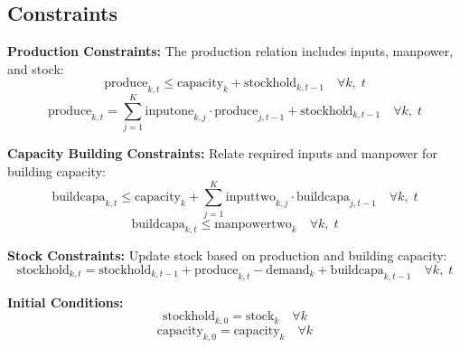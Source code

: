 \documentclass{article}
\begin{document}
\subsection*{Constraints}
\textbf{Production Constraints:} The production relation includes inputs, manpower, and stock:
\[
\text{produce}_{k, t} \leq \text{capacity}_{k} + \text{stockhold}_{k, t-1} \quad \forall k, \; t
\]
\[
\text{produce}_{k, t} = \sum_{j=1}^{K} \text{inputone}_{k, j} \cdot \text{produce}_{j, t-1} + \text{stockhold}_{k, t-1} \quad \forall k, \; t
\]

\textbf{Capacity Building Constraints:} Relate required inputs and manpower for building capacity:
\[
\text{buildcapa}_{k, t} \leq \text{capacity}_{k} + \sum_{j=1}^{K} \text{inputtwo}_{k, j} \cdot \text{buildcapa}_{j, t-1} \quad \forall k, \; t
\]
\[
\text{buildcapa}_{k, t} \leq \text{manpowertwo}_{k} \quad \forall k, \; t
\]

\textbf{Stock Constraints:} Update stock based on production and building capacity:
\[
\text{stockhold}_{k, t} = \text{stockhold}_{k, t-1} + \text{produce}_{k, t} - \text{demand}_{k} + \text{buildcapa}_{k, t-1} \quad \forall k, \; t
\]

\textbf{Initial Conditions:}
\[
\text{stockhold}_{k, 0} = \text{stock}_{k} \quad \forall k
\]
\[
\text{capacity}_{k, 0} = \text{capacity}_{k} \quad \forall k
\]
\end{document}

